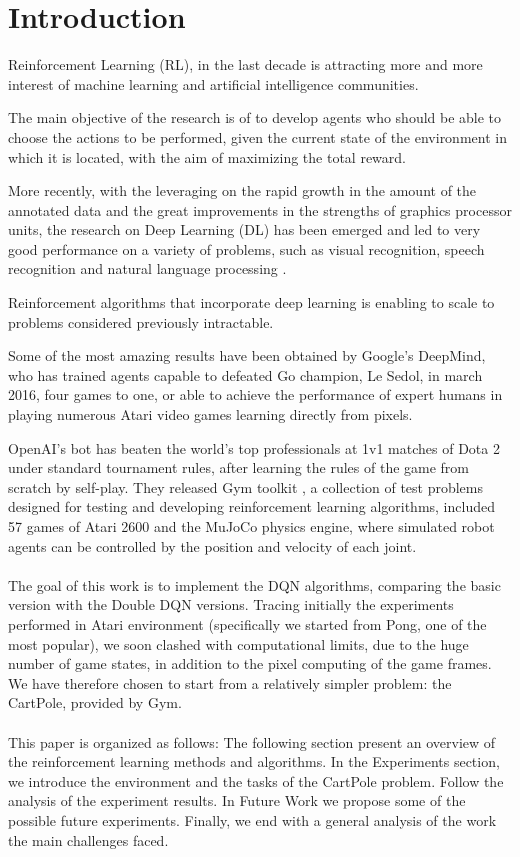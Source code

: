 \section{Introduction}

Reinforcement Learning (RL), in the last decade is attracting more and more interest of machine learning and artificial intelligence communities.

The main objective of the research is of to develop agents who should be able to choose the actions to be performed, given the current state of the environment in which it is located, with the aim of maximizing the total reward.

More recently, with the leveraging on the rapid growth in the amount of the annotated data and the great improvements in the strengths of graphics processor units, the research on  Deep Learning (DL) has been emerged and led to very good performance on a variety of problems, such as visual recognition, speech recognition and natural language processing \cite{AdvancesCNN}.

Reinforcement algorithms that incorporate deep learning is enabling to scale to problems considered previously intractable.

Some of the most amazing results have been obtained by Google’s DeepMind, who has trained agents capable to defeated Go champion, Le Sedol, in march 2016, four games to one, or able to achieve the performance of expert humans in playing numerous Atari video games learning directly from pixels.

OpenAI's bot has beaten the world's top professionals at 1v1 matches of Dota 2 under standard tournament rules, after learning the rules of the game from scratch by self-play.
They released Gym toolkit \cite{Gym}, a collection of test problems designed for testing and developing reinforcement learning algorithms, included 57 games of Atari 2600 and the MuJoCo physics engine, where simulated robot agents can be controlled by the position and velocity of each joint. 
\\\\
The goal of this work is to implement the DQN algorithms, comparing the basic version with the Double DQN versions. Tracing initially the experiments performed in Atari environment (specifically we started from Pong, one of the most popular), we soon clashed with computational limits, due to the huge number of game states, in addition to the pixel computing of the game frames. We have therefore chosen to start from a relatively simpler problem: the CartPole, provided by Gym.
\\\\
This paper is organized as follows:
The following section present an overview of the reinforcement learning methods and algorithms. In the Experiments section, we introduce the environment and the tasks of the CartPole problem.
Follow the analysis of the experiment results. In Future Work we propose some of the possible future experiments.
Finally, we end with a general analysis of the work the main challenges faced.